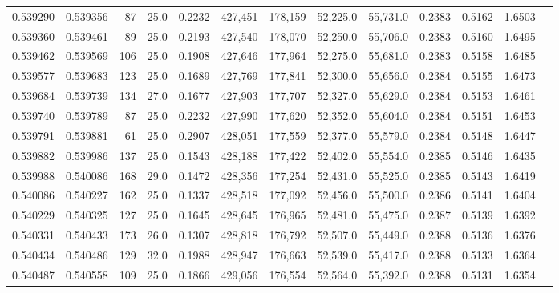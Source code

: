 \begin{tabular}{rrrrrrrrrrrrr}
0.539290 & 0.539356 &    87 & 25.0 &                                     0.2232 & 427,451 & 178,159 &  52,225.0 &  55,731.0 & 0.2383 & 0.5162 & 1.6503 \\
0.539360 & 0.539461 &    89 & 25.0 &                                     0.2193 & 427,540 & 178,070 &  52,250.0 &  55,706.0 & 0.2383 & 0.5160 & 1.6495 \\
0.539462 & 0.539569 &   106 & 25.0 &                                     0.1908 & 427,646 & 177,964 &  52,275.0 &  55,681.0 & 0.2383 & 0.5158 & 1.6485 \\
0.539577 & 0.539683 &   123 & 25.0 &                                     0.1689 & 427,769 & 177,841 &  52,300.0 &  55,656.0 & 0.2384 & 0.5155 & 1.6473 \\
0.539684 & 0.539739 &   134 & 27.0 &                                     0.1677 & 427,903 & 177,707 &  52,327.0 &  55,629.0 & 0.2384 & 0.5153 & 1.6461 \\
0.539740 & 0.539789 &    87 & 25.0 &                                     0.2232 & 427,990 & 177,620 &  52,352.0 &  55,604.0 & 0.2384 & 0.5151 & 1.6453 \\
0.539791 & 0.539881 &    61 & 25.0 &                                     0.2907 & 428,051 & 177,559 &  52,377.0 &  55,579.0 & 0.2384 & 0.5148 & 1.6447 \\
0.539882 & 0.539986 &   137 & 25.0 &                                     0.1543 & 428,188 & 177,422 &  52,402.0 &  55,554.0 & 0.2385 & 0.5146 & 1.6435 \\
0.539988 & 0.540086 &   168 & 29.0 &                                     0.1472 & 428,356 & 177,254 &  52,431.0 &  55,525.0 & 0.2385 & 0.5143 & 1.6419 \\
0.540086 & 0.540227 &   162 & 25.0 &                                     0.1337 & 428,518 & 177,092 &  52,456.0 &  55,500.0 & 0.2386 & 0.5141 & 1.6404 \\
0.540229 & 0.540325 &   127 & 25.0 &                                     0.1645 & 428,645 & 176,965 &  52,481.0 &  55,475.0 & 0.2387 & 0.5139 & 1.6392 \\
0.540331 & 0.540433 &   173 & 26.0 &                                     0.1307 & 428,818 & 176,792 &  52,507.0 &  55,449.0 & 0.2388 & 0.5136 & 1.6376 \\
0.540434 & 0.540486 &   129 & 32.0 &                                     0.1988 & 428,947 & 176,663 &  52,539.0 &  55,417.0 & 0.2388 & 0.5133 & 1.6364 \\
0.540487 & 0.540558 &   109 & 25.0 &                                     0.1866 & 429,056 & 176,554 &  52,564.0 &  55,392.0 & 0.2388 & 0.5131 & 1.6354 \\

\end{tabular}
